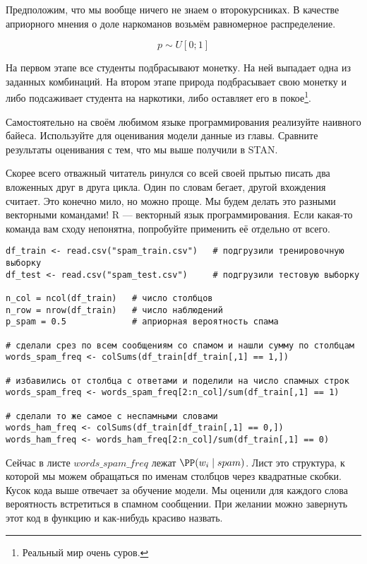 \begin{problem}
\begin{sol} 
Предположим, что мы вообще ничего не знаем о второкурсниках. В качестве априорного мнения о доле наркоманов возьмём равномерное распределение. 

\[ p \sim U[0;1]\]

На первом этапе все студенты подбрасывают монетку. На ней выпадает одна из заданных комбинаций. На втором этапе природа подбрасывает свою монетку и либо подсаживает студента на наркотики, либо оставляет его в покое\footnote{Реальный мир очень суров.}. 

\end{sol} 	
\end{problem}

\begin{problem}
Самостоятельно на своём любимом языке программирования реализуйте наивного байеса. Используйте для оценивания модели данные из главы. Сравните результаты оценивания с тем, что мы выше получили в STAN.

\begin{sol} 

Скорее всего отважный читатель ринулся со всей своей прытью писать два вложенных друг в друга цикла. Один по словам бегает, другой вхождения считает. Это конечно мило, но можно проще.  Мы будем делать это разными векторными командами! R --- векторный язык программирования. Если какая-то команда вам сходу непонятна, попробуйте применить её отдельно от всего. 

\begin{verbatim}
df_train <- read.csv("spam_train.csv")   # подгрузили тренировочную выборку
df_test <- read.csv("spam_test.csv")     # подгрузили тестовую выборку 

n_col = ncol(df_train)   # число столбцов
n_row = nrow(df_train)   # число наблюдений
p_spam = 0.5             # априорная вероятность спама 

# сделали срез по всем сообщениям со спамом и нашли сумму по столбцам
words_spam_freq <- colSums(df_train[df_train[,1] == 1,])

# избавились от столбца с ответами и поделили на число спамных строк
words_spam_freq <- words_spam_freq[2:n_col]/sum(df_train[,1] == 1)

# сделали то же самое с неспамными словами 
words_ham_freq <- colSums(df_train[df_train[,1] == 0,])
words_ham_freq <- words_ham_freq[2:n_col]/sum(df_train[,1] == 0)
\end{verbatim}

Сейчас в листе $words\_spam\_freq$ лежат $\PP(w_i \mid spam)$.  Лист это структура,  к которой мы можем обращаться по именам столбцов через квадратные скобки. Кусок кода выше отвечает за обучение модели. Мы оценили для каждого слова вероятность встретиться в спамном сообщении. При желании можно завернуть этот код в функцию и как-нибудь красиво назвать. 


\end{sol}
\end{problem}
